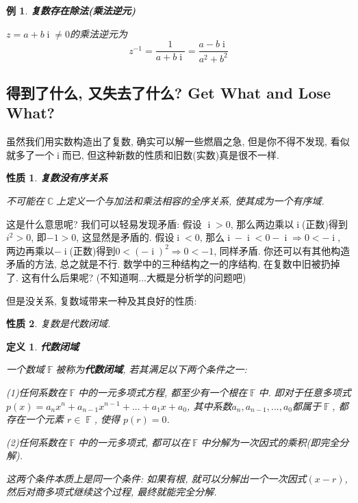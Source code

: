 \documentclass[UTF8]{ctexart}
\newcommand{\<}{\langle}
\renewcommand{\>}{\rangle}
\DeclareMathOperator{\C}{\mathbb{C}}
\DeclareMathOperator{\F}{\mathbb{F}}
\DeclareMathOperator{\ii}{\mathrm{i}}
\newtheorem{dfn}[thm]{定义}
\newtheorem{ppt}{性质}[thm]
\newtheorem{xmp}{例}[subsection]
\begin{document}
            \begin{xmp}
                \textbf{复数存在除法(乘法逆元)}

                $z=a+b\ii\neq 0$的乘法逆元为
                \[z^{-1}=\frac{1}{a+b\ii}=\frac{a-b\ii}{a^2+b^2}\]
            \end{xmp}

        \subsection{得到了什么, 又失去了什么? Get What and Lose What?}

            虽然我们用实数构造出了复数, 确实可以解一些燃眉之急, 但是你不得不发现, 看似就多了一个$\ii$而已, 但这种新数的性质和旧数(实数)真是很不一样.

            \begin{ppt}
                \textbf{复数没有序关系}

                不可能在$\C$上定义一个与加法和乘法相容的全序关系, 使其成为一个有序域.
            \end{ppt}

            这是什么意思呢? 我们可以轻易发现矛盾: 假设 $\ii > 0$, 那么两边乘以$\ii$(正数)得到$i^2>0$, 即$-1 > 0$, 这显然是矛盾的. 假设$\ii<0$, 那么$\ii-\ii<0-\ii \Longrightarrow 0 < -\ii$, 两边再乘以$-\ii$(正数)得到$0<(-\ii)^2 \Longrightarrow 0 < -1$, 同样矛盾. 你还可以有其他构造矛盾的方法, 总之就是不行. 数学中的三种结构之一的序结构, 在复数中旧被扔掉了. 这有什么后果呢? (不知道啊...大概是分析学的问题吧)

            但是没关系, 复数域带来一种及其良好的性质:
            
            \begin{ppt}
                复数是代数闭域.
            \end{ppt}

            \begin{dfn}
                \textbf{代数闭域}

                一个数域$\F$被称为\textbf{代数闭域}, 若其满足以下两个条件之一:

                (1)任何系数在$\F$中的一元多项式方程, 都至少有一个根在$\F$中. 即对于任意多项式$p(x) = a_nx^n + a_{n-1}x^{n-1} + ... + a_1x + a_0$, 其中系数$a_n, a_{n-1}, ..., a_0$都属于$\F$, 都存在一个元素 $r \in \F$, 使得 $p(r) = 0$. 

                (2)任何系数在$\F$中的一元多项式, 都可以在$\F$中分解为一次因式的乘积(即完全分解). 

                这两个条件本质上是同一个条件: 如果有根, 就可以分解出一个一次因式$(x - r)$, 然后对商多项式继续这个过程, 最终就能完全分解.
            \end{dfn}
\end{document}
